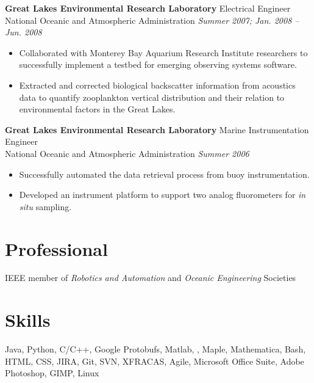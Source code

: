 \documentclass{article}
\begin{document}
{\begin{multicols}{2}

    \textbf{Great Lakes Environmental Research Laboratory } \hfill  Electrical Engineer \\ 
	National Oceanic and Atmospheric Administration \hfill \textsl{Summer 2007; Jan. 2008 -- Jun. 2008}  \\
    \vspace{ -2 mm}	
    \begin{itemize}
	\item Collaborated with Monterey Bay Aquarium Research Institute researchers to successfully implement a testbed for emerging 	observing systems software.
	\item Extracted and corrected biological backscatter information from acoustics data to quantify zooplankton vertical distribution and 	their relation to environmental factors in the Great Lakes.
    \end{itemize}\vspace{-2mm}

    \textbf{Great Lakes Environmental Research Laboratory } \hfill Marine Instrumentation Engineer  \\ 
	National Oceanic and Atmospheric Administration \hfill \textsl{Summer 2006} \\
    \vspace{ -2 mm}	
    \begin{itemize}
	\item Successfully automated the data retrieval process from buoy instrumentation.
	\item Developed an instrument platform to support two analog fluorometers for \textit{in situ} sampling.
    \end{itemize}

    \section{Professional} 
    
    IEEE member of \textsl{Robotics and Automation} and \textsl{Oceanic Engineering} Societies  
	    
    \section{Skills} 

    Java, Python, C/C++, Google Protobufs, Matlab, \LaTeXe, Maple, Mathematica, Bash, HTML, CSS, JIRA, Git, SVN, XFRACAS, Agile, Microsoft Office Suite, Adobe Photoshop, GIMP, Linux

\end{multicols}

}
\end{document}
